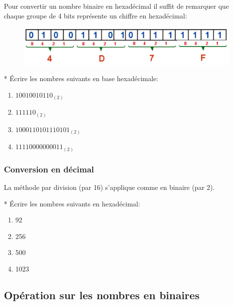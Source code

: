 \documentclass[11pt, a4paper]{book}
\begin{document}
Pour convertir un nombre binaire en hexadécimal il suffit de remarquer que chaque groupe de 4 bits représente un chiffre en hexadécimal:

\begin{figure}[h]
\begin{center}
\includegraphics[scale=.5]{images/hexadecimal}
\end{center}
\end{figure}

\begin{exercice}
* Écrire les nombres suivants en base hexadécimale:
\begin{multicols}{2}
\begin{enumerate}
\item $10010010110_{(2)}$
\item $111110_{(2)}$
\item  $1000110101110101_{(2)}$
\item $11110000000011_{(2)}$
\end{enumerate}
\end{multicols}
\end{exercice}

\subsubsection{Conversion en décimal}

La méthode par division (par 16) s'applique comme en binaire (par 2).

\begin{exercice}
* Écrire les nombres suivants en hexadécimal:
\begin{multicols}{2}
\begin{enumerate}
\item 92
\item 256
\item  500
\item 1023
\end{enumerate}
\end{multicols}
\end{exercice}



\subsection{Opération sur les nombres en binaires}
\end{document}
